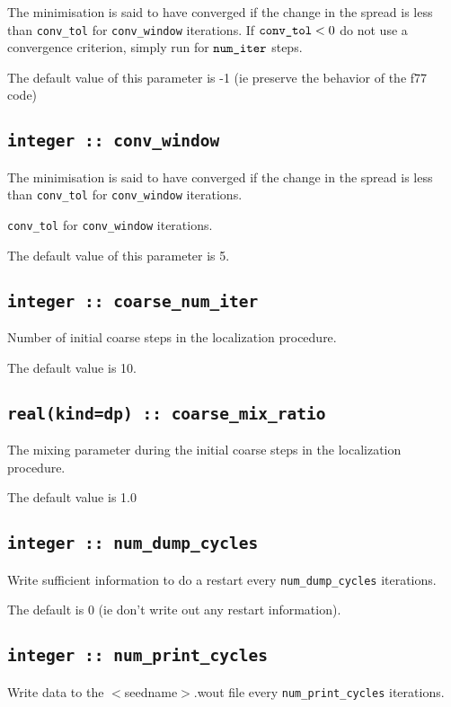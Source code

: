 The minimisation is said to have converged if the change in
the spread is less than \verb#conv_tol# for \verb#conv_window# iterations.
 If $ \verb#conv_tol#<0$ do not use a convergence criterion, simply run
 for $\verb#num_iter#$ steps. 


The default value of this parameter is -1 (ie preserve the behavior of
the f77 code)


\subsection[conv\_window]{\tt integer :: conv\_window}

The minimisation is said to have converged if the change in
the spread is less than \verb#conv_tol# for \verb#conv_window# iterations.

\verb#conv_tol# for \verb#conv_window# iterations.

The default value of this parameter is 5.


\subsection[coarse\_num\_iter]{\tt integer :: coarse\_num\_iter}

Number of initial coarse steps in the  localization
procedure.

The default value is 10.


\subsection[coarse\_mix\_ratio]{\tt real(kind=dp) :: coarse\_mix\_ratio}
The mixing parameter during the initial coarse steps in the localization
procedure.

The default value is 1.0

\subsection[num\_dump\_cycles]{\tt integer :: num\_dump\_cycles}
Write sufficient information to do a restart every
\verb#num_dump_cycles# iterations.

The default is 0 (ie don't write out any restart information).

\subsection[num\_print\_cycles]{\tt integer :: num\_print\_cycles}
Write data to the $<$seedname$>$.wout file every
\verb#num_print_cycles# iterations.
                                                                                                                              
